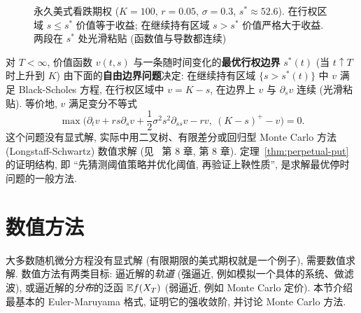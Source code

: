 \begin{figure}[htbp]
\centering
{}
\caption{永久美式看跌期权 ($K=100$, $r=0.05$, $\sigma=0.3$, $s^*\approx52.6$). 在行权区域 $s\le s^*$ 价值等于收益; 在继续持有区域 $s>s^*$ 价值严格大于收益. 两段在 $s^*$ 处光滑粘贴 (函数值与导数都连续)}
\label{fig:perpetual-put}
\end{figure}

\begin{remark}[有限期限的美式看跌期权]
对 $T<\infty$, 价值函数 $v(t,s)$ 与一条随时间变化的\textbf{最优行权边界} $s^*(t)$ (当 $t\uparrow T$ 时上升到 $K$) 由下面的\textbf{自由边界问题}决定: 在继续持有区域 $\{s>s^*(t)\}$ 中 $v$ 满足 Black-Scholes 方程, 在行权区域中 $v=K-s$, 在边界上 $v$ 与 $\partial_sv$ 连续 (光滑粘贴). 等价地, $v$ 满足变分不等式
\[
\max\Big(\partial_tv+rs\partial_sv+\frac{1}{2}\sigma^2s^2\partial_{ss}v-rv,\ (K-s)^+-v\Big)=0.
\]
这个问题没有显式解, 实际中用二叉树、有限差分或回归型 Monte Carlo 方法 (Longstaff-Schwartz) 数值求解 (见~\cite{shreve} 第 8 章, \cite{glasserman} 第 8 章). 定理~\ref{thm:perpetual-put} 的证明结构, 即 ``先猜测阈值策略并优化阈值, 再验证上鞅性质'', 是求解最优停时问题的一般方法.
\end{remark}

\section{数值方法}
\label{sec:6-5}

大多数随机微分方程没有显式解 (有限期限的美式期权就是一个例子), 需要数值求解. 数值方法有两类目标: 逼近解的\emph{轨道} (强逼近, 例如模拟一个具体的系统、做滤波), 或逼近解的\emph{分布}的泛函 $\mathbb{E} f(X_T)$ (弱逼近, 例如 Monte Carlo 定价). 本节介绍最基本的 Euler-Maruyama 格式, 证明它的强收敛阶, 并讨论 Monte Carlo 方法.

